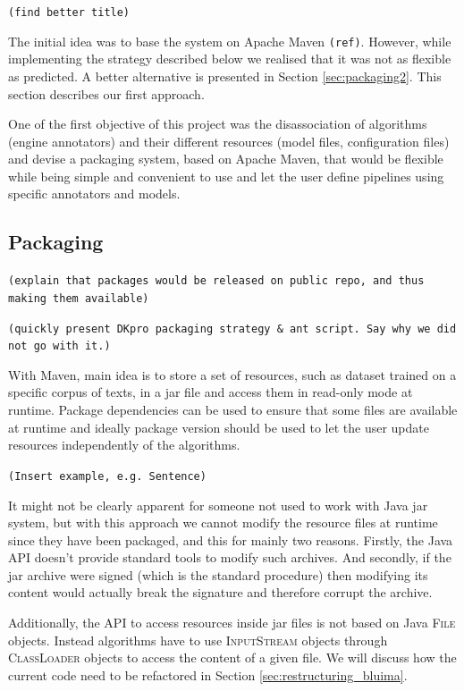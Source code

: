 \documentclass{article}
\newcommand{\ID}[1]{{\textsc{#1}}}
\newcommand{\TODO}[1]{\texttt{\textcolor{YellowOrange}{(#1)}}} %
\begin{document}
\TODO{find better title}

The initial idea was to base the system on Apache Maven \TODO{ref}. However, while implementing the strategy described below we realised that it was not as flexible as predicted. A better alternative is presented in Section \ref{sec:packaging2}. This section describes our first approach.

One of the first objective of this project was the disassociation of algorithms (engine annotators) and their different resources (model files, configuration files) and devise a packaging system, based on Apache Maven, that would be flexible while being simple and convenient to use and let the user define pipelines using specific annotators and models.

\subsection{Packaging}

\TODO{explain that packages would be released on public repo, and thus making them available}

\TODO{quickly present DKpro packaging strategy \& ant script. Say why we did not go with it.}

With Maven, main idea is to store a set of resources, such as dataset trained on a specific corpus of texts, in a jar file and access them in read-only mode at runtime. Package dependencies can be used to ensure that some files are available at runtime and ideally package version should be used to let the user update resources independently of the algorithms.

\TODO{Insert example, e.g. Sentence}

It might not be clearly apparent for someone not used to work with Java jar system, but with this approach we cannot modify the resource files at runtime since they have been packaged, and this for mainly two reasons. Firstly, the Java API doesn't provide standard tools to modify such archives. And secondly, if the jar archive were signed (which is the standard procedure) then modifying its content would actually break the signature and therefore corrupt the archive.

Additionally, the API to access resources inside jar files is not based on Java \ID{File} objects. Instead algorithms have to use \ID{InputStream} objects through \ID{ClassLoader} objects to access the content of a given file. We will discuss how the current code need to be refactored in Section \ref{sec:restructuring_bluima}.
\end{document}
